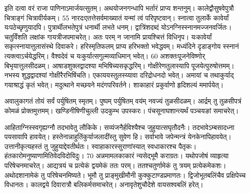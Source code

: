 इति दत्वा वरं राजा पाणिनाऽमार्जयत्सुतम्।
 अथयोजनगन्धापि भर्तारं प्राप्य शन्तनुम्।
 कालेद्वौसुषवेपुत्रौ चित्राङ्गं चित्रावीर्यकम्।
 55 नारदःएतत्तेसर्वमाख्यातं यन्मां त्वं परिपृष्टवान्।
 स्नात्वा तुलार्के कावेर्यां यःपठेच्छृणुयादपि।
 पुत्रार्थीलभतेपुत्रं धनार्थी लभते धनम्।
 द्वात्रिंशदब्दं योऽनग्निस्स्नानमज्जनवर्जितः।
 चतुर्विंशति लक्षांक गायत्रीजपमाचरेत्।
 अतः परम् न जानामि प्रायश्चित्तं विधिनृप।
 यःकावेर्यां सकृत्स्नायात्तुलासंस्थे दिवाकरे।
 हरिस्मृतिफलम् प्राप्य हरिभक्तो भवेद्धवम्।
 मध्यंदिने दृडाङ्गोय स्स्नानं त्यक्त्वाऽर्चयेद्धरिम्।
 वैश्वदेवं च यःकुर्यात्सगुल्मव्याधिमान् भवेत्।
 60 अशक्तःपूजनेविष्णोर् बिभृयात्तुलसीदळम्।
 आषाडशुक्लद्वादश्या मभिषिच्यसकृद्धरिम्।
 गोक्षीरेणतुलास्यापि पूजयेत्पुरुषोत्तमम्।
 नभस्य शुद्धद्वादश्यां गोक्षीरैरभिषिंचति।
 एकाययस्तुलस्य्यावा दरिद्रोधनदो भवेत्।
 अमायां च तथाकुर्याद् गयाश्राद्धं कृतं भवेत्।
 मदुत्थाने मच्छयने मदंगपरिवर्तने।
 शाकाहारं प्रकुर्वाणो हृदिशल्यं ममार्पयेत्।
 
अवालुकागतं तोयं सर्वं पर्युषितम् स्मृतम्।
 पुष्पम् पर्युषितम् वय॑म् नवज्यं तुळसीदळम्।
 आर्द्रम् तु तुळसीपत्रं कोमळं प्रोक्तमुत्तमम्।
 खण्डिनीषिणीचुल्ली उदकुम्भ उपस्करः।
 पंचसूनाघशान्त्यर्थं पञ्चयङां समाचरेत्।
 
आहिताग्निस्स्वगृह्यग्नौ तदभावेतु लौकिके।
 सव्यंजनैर्हविश्यैश्च जुहुयात्सघृतौदनैः।
 तदभावेऽम्बसादध्ना पयसावापि हावयेत्।
 हस्तेनान्नाहुतिंकुर्याजलादींस्तु सुवेण हि।
 सर्वाभावे जपेन्मन्त्रं येनकेनापिहावयेत्।
 उत्तानीकृत्यहस्तं तु जुहुयाद्देवतीर्थतः।
 स्वाहाकारस्सुराणांस्यात् स्वधाकारश्च पैतृकः।
 हंतकारोमनुष्याणामितिवेदविदोविदुः।
 70 अन्नमामलकाकारं न्यसेद्भूमै कराग्रतः।
 यथोपजोषं व्याहृत्या परिषेचनमाचरेत्।
 आद्यत्रयं च प्रत्येकं द्वयमेकं ततः परम्।
 ततश्चतुर्णामेकं तु त्रयम् प्रत्येकमेकशः।
 अथोदशानामेकं तु परिषेचनमिष्यते।
 भूमौ तु प्राङ्मुखीमौनी कुक्कुटाण्डप्रमाणतः।
 द्विजोभूतबलिंचैव प्रक्षिपेच्च विधानतः।
 कालद्वये दिवारात्रौ बलिकर्मसमाचरेत्।
 अनावृतेशुचौदेशे वायसश्वबलिं हरेत्।
 
